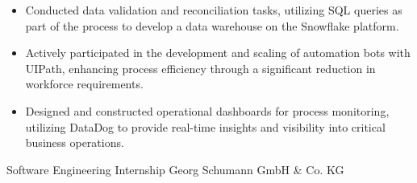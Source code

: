 \documentclass[11pt, letterpaper]{moderncv}
\newcommand{\de}[1]{}
\newcommand{\en}[1]{#1}
\newcommand{\de}[1]{#1}
\newcommand{\en}[1]{}
\begin{document}
        {\en{
        \begin{itemize}
            \item Conducted data validation and reconciliation tasks, utilizing SQL queries as part of the process to develop a data warehouse on the Snowflake platform.
            \item Actively participated in the development and scaling of automation bots with UIPath, enhancing process efficiency through a significant reduction in workforce requirements.
            \item Designed and constructed operational dashboards for process monitoring, utilizing DataDog to provide real-time insights and visibility into critical business operations.
        \end{itemize}}
        \de{
        \begin{itemize}
            \item Durchführung von Datenvalidierungs- und Abgleichsaufgaben unter Verwendung von SQL-Abfragen als Teil des Prozesses zur Entwicklung eines Data Warehouse auf der Snowflake-Plattform.
            \item Aktive Beteiligung an der Entwicklung und Skalierung von Automatisierungsrobotern mit UIPath zur Verbesserung der Prozesseffizienz und Workflow-Automatisierung.
            \item Entwicklung und Erstellung von operativen Dashboards für die Prozessüberwachung unter Verwendung von DataDog, um Echtzeiteinblicke und Einblicke in kritische Geschäftsvorgänge zu ermöglichen.
        \end{itemize}}
        }
        {\en{Software Engineering Internship}\de{Praktikum}}
        {Georg Schumann GmbH \& Co. KG}
        {}
        {}
\end{document}
